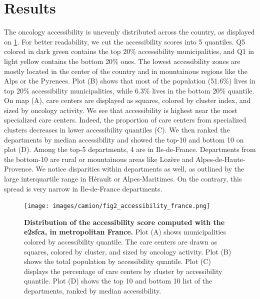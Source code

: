 \section{Results}

The oncology accessibility is unevenly distributed across the country, as
displayed on \cref{fig:accessibility-france}. For better readability, we cut the
accessibility scores into 5 quantiles. Q5 colored in dark green contains the top
20\% accessibility municipalities, and Q1 in light yellow contains the bottom
20\% ones. The lowest accessibility zones are mostly located in the center of
the country and in mountainous regions like the Alps or the Pyrenees. Plot (B)
shows that most of the population (51.6\%) lives in top 20\% accessibility
municipalities, while 6.3\% lives in the bottom 20\% quantile. On map (A), care
centers are displayed as squares, colored by cluster index, and sized by
oncology activity. We see that accessibility is highest near the most
specialized care centers. Indeed, the proportion of care centers from
specialized clusters decreases in lower accessibility quantiles (C). We then
ranked the departments by median accessibility and showed the top-10 and bottom
10 on plot (D). Among the top-5 departments, 4 are in Ile-de-France. Departments
from the bottom-10 are rural or mountainous areas like Lozère and
Alpes-de-Haute-Provence.  We notice disparities within departments as well, as
outlined by the large interquartile range in Hérault or Alpes-Maritimes. On the
contrary, this spread is very narrow in Ile-de-France departments.

\begin{figure}[H]
    \texttt{[image: images/camion/fig2\_accessibility\_france.png]}
    \centering
    \caption{ \textbf{Distribution of the accessibility score computed with the
            \ac{e2sfca}, in metropolitan France.} Plot (A) shows municipalities
        colored by accessibility quantile. The care centers are drawn as
        squares, colored by cluster, and sized by oncology activity. Plot (B)
        shows the total population by accessibility quantile. Plot (C) displays
        the percentage of care centers by cluster by accessibility quantile.
        Plot (D) shows the top 10 and bottom 10 list of the departments, ranked
        by median accessibility. }
    \label{fig:accessibility-france}
\end{figure}

